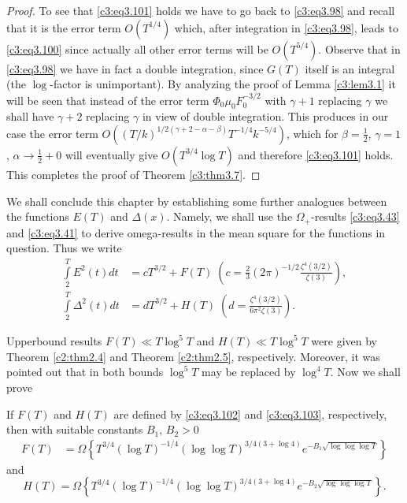 \begin{proof}
To see that \eqref{c3:eq3.101} holds we have to go back to
\eqref{c3:eq3.98} and recall that it is the error term $O(T^{1/4})$
which, after integration in \eqref{c3:eq3.98}, leads to
\eqref{c3:eq3.100} since actually all other error terms will be
$O(T^{5/4})$. Observe that in \eqref{c3:eq3.98} we have in fact a
double integration, since $G(T)$ itself is an integral (the
$\log$-factor is unimportant). By analyzing the proof of Lemma
\ref{c3:lem3.1} it will be seen that instead of the error term $\Phi_0
\mu_0 F_0^{-3/2}$ with $\gamma+1$ replacing $\gamma$ we shall have
$\gamma+2$ replacing $\gamma$ in view of double integration. This
produces in our case the error term $O((T/k)^{1/2(\gamma+2 -\alpha -
  \beta)} T^{-1/4} k^{-5/4})$, which for $\beta = \frac{1}{2}$,
$\gamma=1$, $\alpha \to \frac{1}{2}+ 0$ will eventually give
$O(T^{3/4} \log T)$ and therefore \eqref{c3:eq3.101} holds. This
completes the proof of Theorem \ref{c3:thm3.7}.
\end{proof}

We shall conclude this chapter by establishing some further analogues
between the functions $E(T)$ and $\Delta(x)$. Namely, we shall use the
$\Omega_+$-results \eqref{c3:eq3.43} and \eqref{c3:eq3.41} to derive
omega-results in the mean square for the functions in question. Thus
we write
\begin{align}
  \int\limits_2^T E^2 (t) dt & = cT^{3/2} + F(T)  \;  \left(c= \frac{2}{3}
  (2\pi)^{-1/2} \frac{\zeta^4   (3/2)}{\zeta(3)}\right),\label{c3:eq3.102}\\
  \int\limits_2^T \Delta^2 (t) dt & = dT^{3/2} + H(T) \;  \left(d=
  \frac{\zeta^4 (3/2)}{6 \pi^2 \zeta(3)} \right). \label{c3:eq3.103}
\end{align}

Upper\pageoriginale bound results $F(T) \ll T \log^5 T$ and $H(T)\ll T
\log ^5 T$ 
were given by Theorem \ref{c2:thm2.4} and Theorem \ref{c2:thm2.5},
respectively. Moreover, it was pointed out that in both bounds
$\log^5T$ may be replaced by $\log^4 T$. Now we shall prove
\begin{thm}\label{c3:thm3.8}
  If $F(T)$ and $H(T)$ are defined by \eqref{c3:eq3.102} and
  \eqref{c3:eq3.103}, respectively, then with suitable constants
  $B_1$, $B_2> 0$
{\fontsize{10pt}{12pt}\selectfont
  \begin{align}
    F(T) & = \Omega \left\{T^{3/4}(\log T)^{-1/4} (\log \log T)^{3/4 (3 +
      \log 4)} e^{-B_1\sqrt{\log \log \log T}}
    \right\}\label{c3:eq3.104}
  \end{align}}
and
{\fontsize{10pt}{12pt}\selectfont
\begin{equation}
    H(T)  = \Omega \left\{T^{3/4} (\log T)^{-1/4} (\log \log T)^{3/4
      (3 + \log 4)} e^{-B_2 \sqrt{\log \log \log T}}\right\}.
    \label{c3:eq3.105} 
\end{equation}}
\end{thm}

